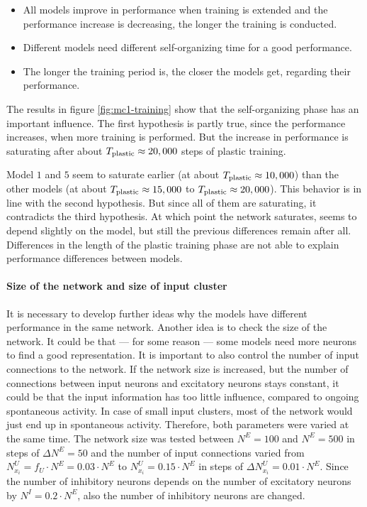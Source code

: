 \begin{itemize}
\item All models improve in performance when training is extended and the performance increase is decreasing, the longer the training is conducted.
\item Different models need different self-organizing time for a good performance.
\item The longer the training period is, the closer the models get, regarding their performance.
\end{itemize}

The results in figure \ref{fig:mc1-training} show that the self-organizing phase has an important influence. The first hypothesis is partly true, since the performance increases, when more training is performed. But the increase in performance is saturating after about $T_{\text{plastic}} \approx 20,000$ steps of plastic training.

Model $1$ and $5$ seem to saturate earlier (at about $T_{\text{plastic}} \approx 10,000$) than the other models (at about $T_{\text{plastic}} \approx 15,000$ to $T_{\text{plastic}} \approx 20,000$). This behavior is in line with the second hypothesis. But since all of them are saturating, it contradicts the third hypothesis. At which point the network saturates, seems to depend slightly on the model, but still the previous differences remain after all. Differences in the length of the plastic training phase are not able to explain performance differences between models.

\paragraph{Size of the network and size of input cluster}

It is necessary to develop further ideas why the models have different performance in the same network. Another idea is to check the size of the network. It could be that --- for some reason --- some models need more neurons to find a good representation. It is important to also control the number of input connections to the network. If the network size is increased, but the number of connections between input neurons and excitatory neurons stays constant, it could be that the input information has too little influence, compared to ongoing spontaneous activity. In case of small input clusters, most of the network would just end up in spontaneous activity. Therefore, both parameters were varied at the same time. The network size was tested between $N^E = 100$ and $N^E = 500$ in steps of $\Delta N^E = 50$ and the number of input connections varied from $N^U_{x_i} = f_U \cdot N^E = 0.03 \cdot N^E$ to $N^U_{x_i} = 0.15 \cdot N^E$ in steps of $\Delta N^U_{x_i} = 0.01 \cdot N^E$. Since the number of inhibitory neurons depends on the number of excitatory neurons by $N^I = 0.2 \cdot N^E$, also the number of inhibitory neurons are changed.


